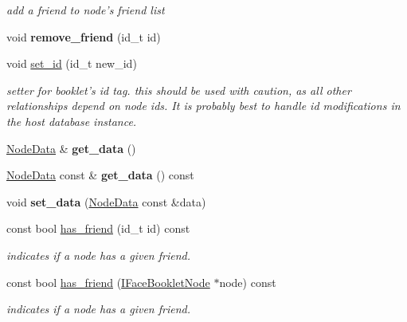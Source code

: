 \begin{DoxyCompactItemize}
\begin{DoxyCompactList}\small\item\em add a friend to node's friend list \end{DoxyCompactList}\item 
\hypertarget{classfb_1_1_profile_a45472768709c2eb8665ce6e50e2fb5ce}{void {\bfseries remove\+\_\+friend} (id\+\_\+t id)}\label{classfb_1_1_profile_a45472768709c2eb8665ce6e50e2fb5ce}

\item 
void \hyperlink{classfb_1_1_profile_ab0e41fa533ff8b01abc339c9f0aa7205}{set\+\_\+id} (id\+\_\+t new\+\_\+id)
\begin{DoxyCompactList}\small\item\em setter for booklet's id tag.  this should be used with caution, as all other relationships depend on node ids. It is probably best to handle id modifications in the host database instance. \end{DoxyCompactList}\item 
\hypertarget{classfb_1_1_profile_a6a579e8b0adade2c3cd499882cf473fc}{\hyperlink{classfb_1_1_node_data}{Node\+Data} \& {\bfseries get\+\_\+data} ()}\label{classfb_1_1_profile_a6a579e8b0adade2c3cd499882cf473fc}

\item 
\hypertarget{classfb_1_1_profile_abc344e9cdafc14dafdaa74678a3cfa48}{\hyperlink{classfb_1_1_node_data}{Node\+Data} const \& {\bfseries get\+\_\+data} () const }\label{classfb_1_1_profile_abc344e9cdafc14dafdaa74678a3cfa48}

\item 
\hypertarget{classfb_1_1_profile_a278304ec0bd7b0f079292069da3cf46f}{void {\bfseries set\+\_\+data} (\hyperlink{classfb_1_1_node_data}{Node\+Data} const \&data)}\label{classfb_1_1_profile_a278304ec0bd7b0f079292069da3cf46f}

\item 
const bool \hyperlink{classfb_1_1_profile_a5f74385d661e8923dd5e66faf35247d7}{has\+\_\+friend} (id\+\_\+t id) const 
\begin{DoxyCompactList}\small\item\em indicates if a node has a given friend. \end{DoxyCompactList}\item 
const bool \hyperlink{classfb_1_1_profile_abe318da2aba42f412dc7373057aa983b}{has\+\_\+friend} (\hyperlink{structfb_1_1_i_face_booklet_node}{I\+Face\+Booklet\+Node} $\ast$node) const 
\begin{DoxyCompactList}\small\item\em indicates if a node has a given friend. \end{DoxyCompactList}\end{DoxyCompactItemize}


